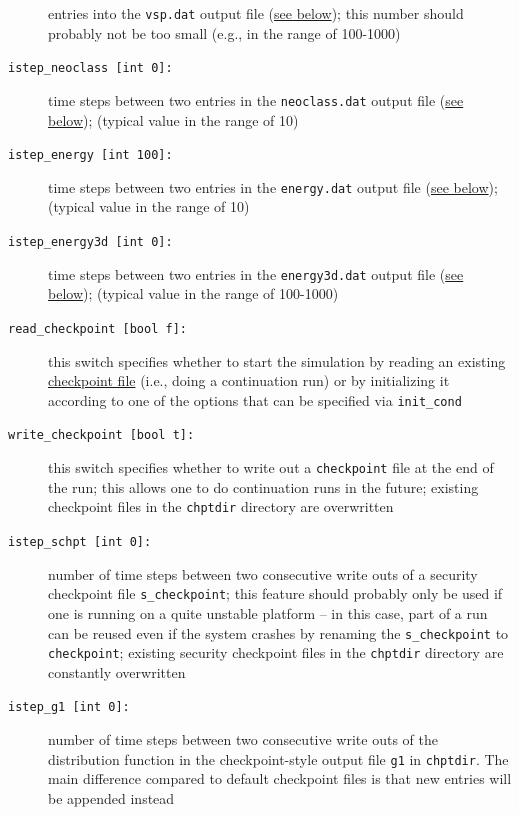 \documentclass[12pt]{article}
\begin{document}
\begin{description}
entries into the \texttt{vsp.dat} output file (\hyperref[subsec:vsp-file]{see below}); 
this number should probably not be too small (e.g., in the range of 100-1000)
\item[\hypertarget{istep_neoclass}{\tt istep\_neoclass [int 0]:}] time steps between two entries in the \texttt{neoclass.dat} output file
(\hyperref[subsec:neoclass-file]{see below}); 
(typical value in the range of 10)
\item[\hypertarget{istep_energy}{\tt istep\_energy [int 100]:}] time steps between two entries in the \texttt{energy.dat} output file
(\hyperref[subsec:energy-file]{see below}); 
(typical value in the range of 10)
\item[\hypertarget{istep_energy3d}{\tt istep\_energy3d [int 0]:}] time
steps between two entries in the \texttt{energy3d.dat} output file
(\hyperref[subsec:energy-file]{see below}); 
(typical value in the range of 100-1000)
\item[\texttt{read\_checkpoint [bool f]:}] this switch specifies whether to start the simulation by
reading an existing \hyperref[subsec:chpt-files]{checkpoint file} 
(i.e., doing a continuation run) or by initializing it according
to one of the options that can be specified via \texttt{init\_cond}
\item[\texttt{write\_checkpoint [bool t]:}] this switch specifies whether to write out a {\tt checkpoint} 
file at the end of the run; this allows one to do continuation runs in the future; 
existing checkpoint files in the \texttt{chptdir} directory are overwritten
\item[\texttt{istep\_schpt [int 0]:}] number of time steps between two consecutive write outs of a
security checkpoint file {\tt s\_checkpoint}; this feature should probably only be used if one is 
running on a quite unstable platform -- in this case, part of a run can be reused even if the system 
crashes by renaming the {\tt s\_checkpoint} to {\tt checkpoint}; existing security checkpoint files 
in the \texttt{chptdir} directory are constantly overwritten
\item[\texttt{istep\_g1 [int 0]:}] number of time steps between two consecutive write outs of the 
distribution function in the checkpoint-style output file {\tt g1} in {\tt chptdir}. 
The main difference compared to default checkpoint files is that new entries will be appended instead 

\end{description}
\end{document}
